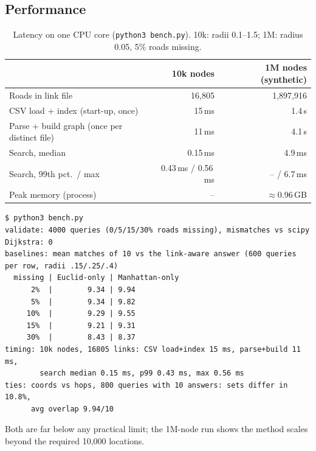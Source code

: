 \documentclass[11pt,a4paper]{article}
\newcommand{\code}[1]{\texttt{#1}}
\begin{document}
\subsection{Performance}
\begin{table}[h]\centering\small
\begin{tabular}{@{}lrr@{}}\toprule
 & \textbf{10k nodes} & \textbf{1M nodes (synthetic)}\\\midrule
Roads in link file & 16{,}805 & 1{,}897{,}916\\
CSV load + index (start-up, once) & 15\,ms & 1.4\,s\\
Parse + build graph (once per distinct file) & 11\,ms & 4.1\,s\\
Search, median & 0.15\,ms & 4.9\,ms\\
Search, 99th pct.\ / max & 0.43\,ms / 0.56\,ms & -- / 6.7\,ms\\
Peak memory (process) & -- & $\approx$0.96\,GB\\\bottomrule
\end{tabular}
\caption{Latency on one CPU core (\code{python3 bench.py}). 10k: radii 0.1--1.5; 1M: radius 0.05, 5\% roads missing.}
\end{table}
\begin{lstlisting}
$ python3 bench.py
validate: 4000 queries (0/5/15/30% roads missing), mismatches vs scipy Dijkstra: 0
baselines: mean matches of 10 vs the link-aware answer (600 queries per row, radii .15/.25/.4)
  missing | Euclid-only | Manhattan-only
      2%  |        9.34 | 9.94
      5%  |        9.34 | 9.82
     10%  |        9.29 | 9.55
     15%  |        9.21 | 9.31
     30%  |        8.43 | 8.37
timing: 10k nodes, 16805 links: CSV load+index 15 ms, parse+build 11 ms,
        search median 0.15 ms, p99 0.43 ms, max 0.56 ms
ties: coords vs hops, 800 queries with 10 answers: sets differ in 10.8%,
      avg overlap 9.94/10
\end{lstlisting}
Both are far below any practical limit; the 1M-node run shows the method scales beyond the required 10{,}000 locations.
\end{document}
